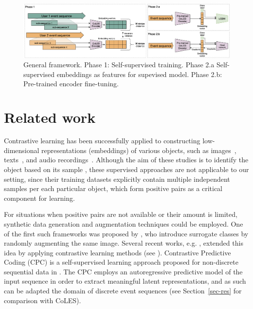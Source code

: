 \documentclass[sigconf]{acmart}
\begin{document}
\begin{figure}[htbp]
  \includegraphics[width=0.98\linewidth]{figures/coles.png}
    \caption{
        General framework.
        Phase 1: Self-supervised training.
        Phase 2.a Self-supervised embeddings as features for supevised model.
        Phase 2.b: Pre-trained encoder fine-tuning.
    }
  \label{fig-arch}
\end{figure}

\section{Related work} \label{sec-rel-work}

Contrastive learning has been successfully applied to constructing low-dimensional representations
(embeddings) of various objects, such as images~\citep{Chopra2005LearningAS,Schroff2015FaceNetAU},
texts~\citep{Reimers2019SentenceBERTSE}, and audio recordings~\citep{Wan2018GeneralizedEL}.
Although the aim of these studies is to identify the object based on its sample
\citep{Schroff2015FaceNetAU,Hu2014DiscriminativeDM,Wan2018GeneralizedEL}, these supervised
approaches are not applicable to our setting, since their training datasets explicitly contain
multiple independent samples per each particular object, which form positive pairs as
a critical component for learning. 

For situations when positive pairs are not available or their amount is limited, synthetic data
generation and augmentation techniques could be employed. One of the first such frameworks was
proposed by \citet{Dosovitskiy2014DiscriminativeUF}, who introduce surrogate classes by randomly
augmenting the same image. Several recent works, e.g. \citep{Bachman2019LearningRB,He2019MomentumCF,Chen2020ASF},
extended this idea by applying contrastive learning methods (see \citep{Falcon2020AFF}).
%
Contrastive Predictive Coding (CPC) is a self-supervised learning approach proposed for non-discrete
sequential data in \citep{Oord2018RepresentationLW}. The CPC employs an autoregressive predictive
model of the input sequence in order to extract meaningful latent representations, and as such
can be adapted the domain of discrete event sequences (see Section~\ref{sec-res} for comparison
with CoLES).
\end{document}
